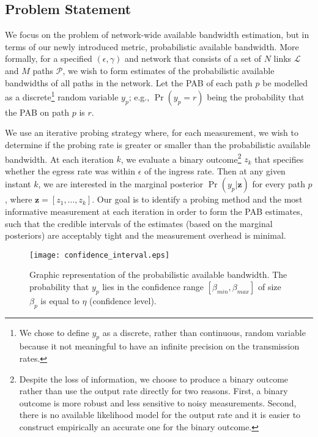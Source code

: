 \documentclass[final,5p,times,twocolumn]{elsarticle}
\newcommand{\CL}{\mathcal{L}}
\newcommand{\CP}{\mathcal{P}}
\begin{document}
\subsection{Problem Statement}
\label{ssec:ps}

We focus on the problem of network-wide available bandwidth estimation, but in terms of our newly introduced metric, probabilistic available bandwidth.  More formally, for a specified $(\epsilon,\gamma)$ and network that consists of a set of $N$ links $\CL$ and $M$ paths $\CP$, we wish to form estimates of the probabilistic available bandwidths of all paths in the network.  Let the PAB of each path $p$ be modelled as a discrete\footnote{We chose to define $y_p$ as a discrete, rather than continuous, random variable because it  not meaningful to have an infinite precision on the transmission rates.} random variable $y_p$; e.g., $\Pr(y_p = r)$ being the probability that the PAB on path $p$ is $r$.  

We use an iterative probing strategy where, for each measurement, we wish to determine if the probing rate is greater or smaller than the probabilistic available bandwidth.  At each iteration $k$, we evaluate a binary outcome\footnote{Despite the loss of information, we choose to produce a binary outcome rather than use the output rate directly for two reasons.  First, a binary outcome is more robust and less sensitive to noisy measurements.  Second, there is no available likelihood model for the output rate and it is easier to construct empirically an accurate one for the binary outcome.} $z_k$ that specifies whether the egress rate was within $\epsilon$ of the ingress rate.  Then at any given instant $k$, we are interested in the marginal posterior $\Pr(y_p | \mathbf{z})$ for every path $p$, where $\mathbf{z}= [z_1,\dots, z_k]$.  Our goal is to identify a probing method and the most informative measurement at each iteration in order to form the PAB estimates, such that the credible intervals of the estimates (based on the marginal posteriors) are acceptably tight and the measurement overhead is minimal.

\begin{figure}[!h]
	\centering
	\texttt{[image: confidence\_interval.eps]}
	\caption{Graphic representation of the probabilistic available bandwidth.  The probability that $y_p$ lies in the confidence range $[\beta_{min},\beta_{max}]$ of size $\beta_p$ is equal to $\eta$ (confidence level).
\label{fig:confidence_interval}}
\end{figure}
\end{document}
